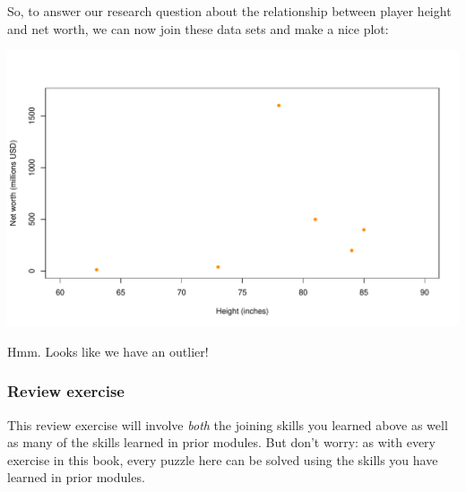 \documentclass[
]{book}
\newenvironment{Shaded}{\begin{snugshade}}{\end{snugshade}}
\newcommand{\DataTypeTok}[1]{\textcolor[rgb]{0.13,0.29,0.53}{#1}}
\newcommand{\DecValTok}[1]{\textcolor[rgb]{0.00,0.00,0.81}{#1}}
\newcommand{\KeywordTok}[1]{\textcolor[rgb]{0.13,0.29,0.53}{\textbf{#1}}}
\newcommand{\NormalTok}[1]{#1}
\newcommand{\OperatorTok}[1]{\textcolor[rgb]{0.81,0.36,0.00}{\textbf{#1}}}
\newcommand{\StringTok}[1]{\textcolor[rgb]{0.31,0.60,0.02}{#1}}
\begin{document}
So, to answer our research question about the relationship between player height and net worth, we can now join these data sets and make a nice plot:

\begin{Shaded}
\end{Shaded}

\includegraphics{figures/unnamed-chunk-212-1.pdf}

Hmm. Looks like we have an outlier!

\hypertarget{review-exercise-4}{%
\subsubsection*{Review exercise}\label{review-exercise-4}}

This review exercise will involve \emph{both} the joining skills you learned above as well as many of the skills learned in prior modules. But don't worry: as with every exercise in this book, every puzzle here can be solved using the skills you have learned in prior modules.
\end{document}
